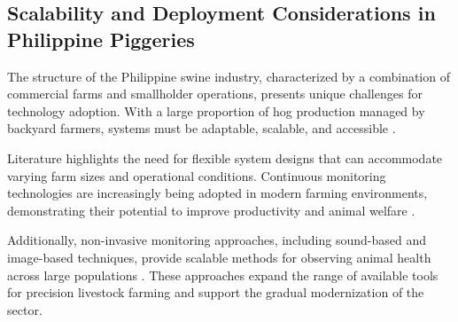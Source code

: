 \subsection{Scalability and Deployment Considerations in Philippine Piggeries}

The structure of the Philippine swine industry, characterized by a combination of commercial farms and smallholder operations, presents unique challenges for technology adoption. With a large proportion of hog production managed by backyard farmers, systems must be adaptable, scalable, and accessible \cite{lo2025rebooting}.

Literature highlights the need for flexible system designs that can accommodate varying farm sizes and operational conditions. Continuous monitoring technologies are increasingly being adopted in modern farming environments, demonstrating their potential to improve productivity and animal welfare \cite{lo2025rebooting, livestockproduction2026}.

Additionally, non-invasive monitoring approaches, including sound-based and image-based techniques, provide scalable methods for observing animal health across large populations \cite{reza2025review, dingcong2017monitoring}. These approaches expand the range of available tools for precision livestock farming and support the gradual modernization of the sector.
